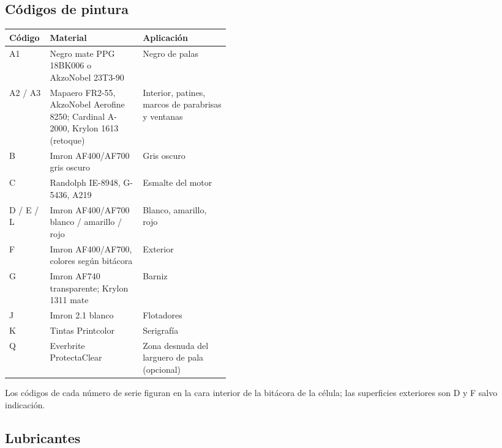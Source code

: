 \subsection{Códigos de pintura}

\begin{center}
\small
\begin{tabularx}{\linewidth}{@{}l>{\raggedright\arraybackslash}p{0.42\linewidth}>{\raggedright\arraybackslash}X@{}}
\toprule
Código & Material & Aplicación \\
\midrule
A1 & Negro mate PPG 18BK006 o AkzoNobel 23T3-90 & Negro de palas \\
A2 / A3 & Mapaero FR2-55, AkzoNobel Aerofine 8250; Cardinal A-2000, Krylon 1613 (retoque) & Interior, patines, marcos de parabrisas y ventanas \\
B & Imron AF400/AF700 gris oscuro & Gris oscuro \\
C & Randolph IE-8948, G-5436, A219 & Esmalte del motor \\
D / E / L & Imron AF400/AF700 blanco / amarillo / rojo & Blanco, amarillo, rojo \\
F & Imron AF400/AF700, colores según bitácora & Exterior \\
G & Imron AF740 transparente; Krylon 1311 mate & Barniz \\
J & Imron 2.1 blanco & Flotadores \\
K & Tintas Printcolor & Serigrafía \\
Q & Everbrite ProtectaClear & Zona desnuda del larguero de pala (opcional) \\
\bottomrule
\end{tabularx}
\end{center}

Los códigos de cada número de serie figuran en la cara interior de la bitácora de la célula; las superficies exteriores son D y F salvo indicación.

\subsection{Lubricantes}

